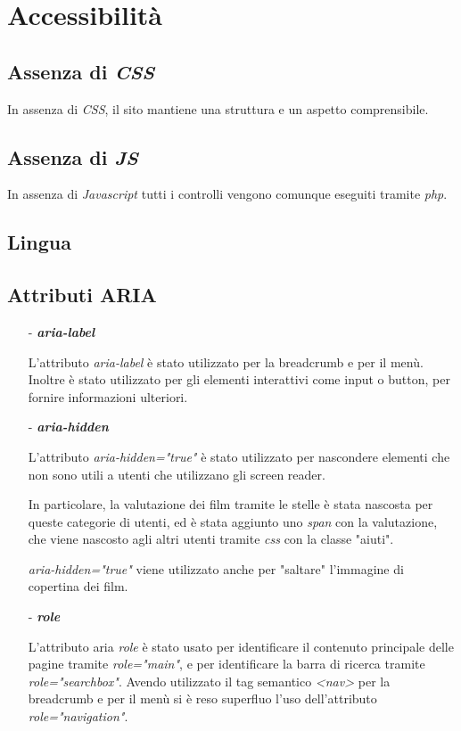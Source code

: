 \documentclass[a4paper]{article}
\begin{document}
\section{Accessibilità}

\subsection{Assenza di \textit{CSS}}
In assenza di \textit{CSS}, il sito mantiene una struttura e un aspetto comprensibile.

\subsection{Assenza di \textit{JS}}
In assenza di \textit{Javascript} tutti i controlli vengono comunque eseguiti tramite \textit{php}.

\subsection{Lingua}

\subsection{Attributi ARIA}

\begin{itemize}
    \item [-] \textit{\textbf{aria-label}}
    
    L'attributo \textit{aria-label} è stato utilizzato per la breadcrumb e per il menù.
    Inoltre è stato utilizzato per gli elementi interattivi come input o button, per fornire informazioni ulteriori.

    \item [-] \textit{\textbf{aria-hidden}}
    
    L'attributo \textit{aria-hidden="true"} è stato utilizzato per nascondere elementi che non sono utili a utenti che utilizzano gli screen reader.

    In particolare, la valutazione dei film tramite le stelle è stata nascosta per queste categorie di utenti, ed è stata aggiunto uno \textit{span} con la valutazione, che viene nascosto agli altri utenti tramite \textit{css} con la classe "aiuti".

    \textit{aria-hidden="true"} viene utilizzato anche per "saltare" l'immagine di copertina dei film.

    \item [-] \textit{\textbf{role}}
    
    L'attributo aria \textit{role} è stato usato per identificare il contenuto principale delle pagine tramite \textit{role="main"}, e per identificare la barra di ricerca tramite \textit{role="searchbox"}.
    Avendo utilizzato il tag semantico \textit{<nav>} per la breadcrumb e per il menù si è reso superfluo l'uso dell'attributo \textit{role="navigation"}.

\end{itemize}
\end{document}
